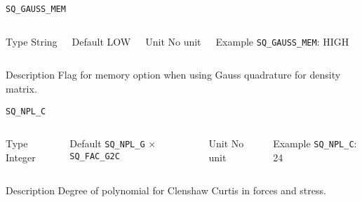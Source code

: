 \begin{frame}[allowframebreaks]{\texttt{SQ\_GAUSS\_MEM}} \label{SQ_GAUSS_MEM}
\vspace*{-12pt}
\begin{columns}
\begin{block}{Type}
String
\end{block}

\begin{block}{Default}
LOW
\end{block}

\begin{block}{Unit}
No unit
\end{block}

\begin{block}{Example}
\texttt{SQ\_GAUSS\_MEM}: HIGH
\end{block}
\end{columns}

\begin{block}{Description}
Flag for memory option when using Gauss quadrature for density matrix. 
\end{block}

\end{frame}


\begin{frame}[allowframebreaks]{\texttt{SQ\_NPL\_C}} \label{SQ_NPL_C}
\vspace*{-12pt}
\begin{columns}
\begin{block}{Type}
Integer
\end{block}

\begin{block}{Default}
\texttt{SQ\_NPL\_G} $\times$ \texttt{SQ\_FAC\_G2C}
\end{block}

\begin{block}{Unit}
No unit
\end{block}

\begin{block}{Example}
\texttt{SQ\_NPL\_C}: 24
\end{block}
\end{columns}

\begin{block}{Description}
Degree of polynomial for Clenshaw Curtis in forces and stress. 
\end{block}

\end{frame}


